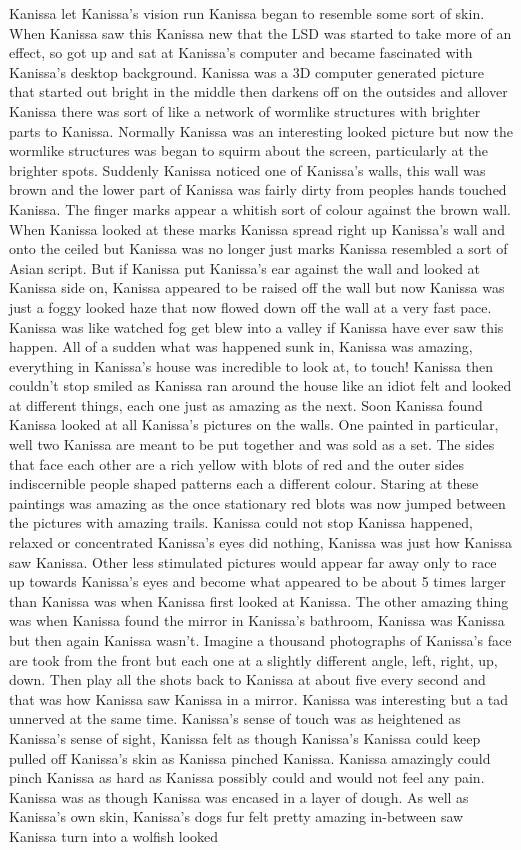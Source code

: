 \documentclass[12pt]{book}
\begin{document}
Kanissa let Kanissa's vision run Kanissa began to resemble some sort of skin. When Kanissa saw this Kanissa new that the LSD was started to take more of an effect, so got up and sat at Kanissa's computer and became fascinated with Kanissa's desktop background. Kanissa was a 3D computer generated picture that started out bright in the middle then darkens off on the outsides and allover Kanissa there was sort of like a network of wormlike structures with brighter parts to Kanissa. Normally Kanissa was an interesting looked picture but now the wormlike structures was began to squirm about the screen, particularly at the brighter spots. Suddenly Kanissa noticed one of Kanissa's walls, this wall was brown and the lower part of Kanissa was fairly dirty from peoples hands touched Kanissa. The finger marks appear a whitish sort of colour against the brown wall. When Kanissa looked at these marks Kanissa spread right up Kanissa's wall and onto the ceiled but Kanissa was no longer just marks Kanissa resembled a sort of Asian script. But if Kanissa put Kanissa's ear against the wall and looked at Kanissa side on, Kanissa appeared to be raised off the wall but now Kanissa was just a foggy looked haze that now flowed down off the wall at a very fast pace. Kanissa was like watched fog get blew into a valley if Kanissa have ever saw this happen. All of a sudden what was happened sunk in, Kanissa was amazing, everything in Kanissa's house was incredible to look at, to touch! Kanissa then couldn't stop smiled as Kanissa ran around the house like an idiot felt and looked at different things, each one just as amazing as the next. Soon Kanissa found Kanissa looked at all Kanissa's pictures on the walls. One painted in particular, well two Kanissa are meant to be put together and was sold as a set. The sides that face each other are a rich yellow with blots of red and the outer sides indiscernible people shaped patterns each a different colour. Staring at these paintings was amazing as the once stationary red blots was now jumped between the pictures with amazing trails. Kanissa could not stop Kanissa happened, relaxed or concentrated Kanissa's eyes did nothing, Kanissa was just how Kanissa saw Kanissa. Other less stimulated pictures would appear far away only to race up towards Kanissa's eyes and become what appeared to be about 5 times larger than Kanissa was when Kanissa first looked at Kanissa. The other amazing thing was when Kanissa found the mirror in Kanissa's bathroom, Kanissa was Kanissa but then again Kanissa wasn't. Imagine a thousand photographs of Kanissa's face are took from the front but each one at a slightly different angle, left, right, up, down. Then play all the shots back to Kanissa at about five every second and that was how Kanissa saw Kanissa in a mirror. Kanissa was interesting but a tad unnerved at the same time. Kanissa's sense of touch was as heightened as Kanissa's sense of sight, Kanissa felt as though Kanissa's Kanissa could keep pulled off Kanissa's skin as Kanissa pinched Kanissa. Kanissa amazingly could pinch Kanissa as hard as Kanissa possibly could and would not feel any pain. Kanissa was as though Kanissa was encased in a layer of dough. As well as Kanissa's own skin, Kanissa's dogs fur felt pretty amazing in-between saw Kanissa turn into a wolfish looked 
\end{document}
